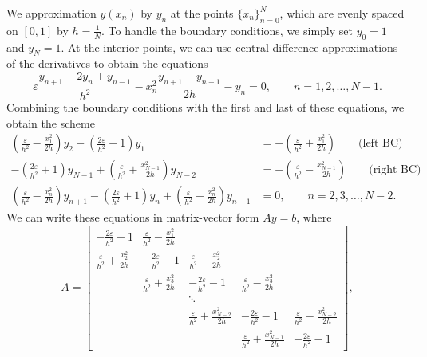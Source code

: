 \documentclass{homework}
\begin{document}
	\begin{alphaparts}
		\questionpart We approximation $y(x_n)$ by $y_n$ at the points $\{x_n\}_{n=0}^N$, which are evenly spaced on $[0,1]$ by $h = \frac{1}{N}$. To handle the boundary conditions, we simply set $y_0 = 1$ and $y_N = 1$. At the interior points, we can use central difference approximations of the derivatives to obtain the equations
		\begin{equation*}
			\varepsilon\frac{y_{n+1} - 2y_n + y_{n-1}}{h^2} -x_n^2\frac{y_{n+1} - y_{n-1}}{2h} - y_n = 0, \qquad n = 1, 2, \dots, N-1.
		\end{equation*}
		Combining the boundary conditions with the first and last of these equations, we obtain the scheme
		\begin{align*}
			\left(\frac{\varepsilon}{h^2} - \frac{x_1^2}{2h}\right)y_{2} - \left(\frac{2\varepsilon}{h^2} + 1\right)y_1 &= -\left(\frac{\varepsilon}{h^2} + \frac{x_1^2}{2h}\right) \qquad \text{(left BC)}\\
			- \left(\frac{2\varepsilon}{h^2} + 1\right)y_{N-1} + \left(\frac{\varepsilon}{h^2} + \frac{x_{N-1}^2}{2h}\right)y_{N-2} &= -\left(\frac{\varepsilon}{h^2} - \frac{x_{N-1}^2}{2h}\right) \qquad \text{(right BC)}\\
			\left(\frac{\varepsilon}{h^2} - \frac{x_n^2}{2h}\right)y_{n+1} - \left(\frac{2\varepsilon}{h^2} + 1\right)y_n + \left(\frac{\varepsilon}{h^2} + \frac{x_n^2}{2h}\right)y_{n-1} &= 0, \qquad n = 2, 3, \dots, N-2.
		\end{align*}
		We can write these equations in matrix-vector form $Ay = b$, where
		\begin{equation*}
			A = \left[\begin{matrix}
				-\frac{2\varepsilon}{h^2} - 1 & \frac{\varepsilon}{h^2} - \frac{x_1^2}{2h} \\
				\frac{\varepsilon}{h^2} + \frac{x_2^2}{2h} & -\frac{2\varepsilon}{h^2} - 1 & \frac{\varepsilon}{h^2} - \frac{x_2^2}{2h} \\
				& \frac{\varepsilon}{h^2} + \frac{x_3^2}{2h} & -\frac{2\varepsilon}{h^2} - 1 & \frac{\varepsilon}{h^2} - \frac{x_3^2}{2h} \\
				& & \ddots\\
				& & \frac{\varepsilon}{h^2} + \frac{x_{N-2}^2}{2h} & -\frac{2\varepsilon}{h^2} - 1 & \frac{\varepsilon}{h^2} - \frac{x_{N-2}^2}{2h}\\
				& & & \frac{\varepsilon}{h^2} + \frac{x_{N-1}^2}{2h} & -\frac{2\varepsilon}{h^2} - 1
			\end{matrix}\right],
		\end{equation*}

\end{alphaparts}
\end{document}
